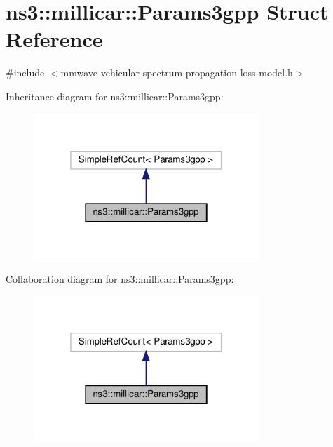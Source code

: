 \hypertarget{structns3_1_1millicar_1_1Params3gpp}{}\section{ns3\+:\+:millicar\+:\+:Params3gpp Struct Reference}
\label{structns3_1_1millicar_1_1Params3gpp}


{\ttfamily \#include $<$mmwave-\/vehicular-\/spectrum-\/propagation-\/loss-\/model.\+h$>$}



Inheritance diagram for ns3\+:\+:millicar\+:\+:Params3gpp\+:\nopagebreak
\begin{figure}[H]
\begin{center}
\leavevmode
\includegraphics[width=241pt]{structns3_1_1millicar_1_1Params3gpp__inherit__graph}
\end{center}
\end{figure}


Collaboration diagram for ns3\+:\+:millicar\+:\+:Params3gpp\+:\nopagebreak
\begin{figure}[H]
\begin{center}
\leavevmode
\includegraphics[width=241pt]{structns3_1_1millicar_1_1Params3gpp__coll__graph}
\end{center}
\end{figure}
